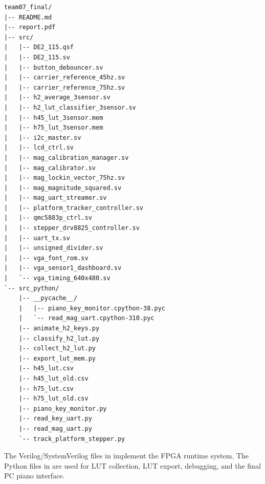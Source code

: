 \begin{lstlisting}
team07_final/
|-- README.md
|-- report.pdf
|-- src/
|   |-- DE2_115.qsf
|   |-- DE2_115.sv
|   |-- button_debouncer.sv
|   |-- carrier_reference_45hz.sv
|   |-- carrier_reference_75hz.sv
|   |-- h2_average_3sensor.sv
|   |-- h2_lut_classifier_3sensor.sv
|   |-- h45_lut_3sensor.mem
|   |-- h75_lut_3sensor.mem
|   |-- i2c_master.sv
|   |-- lcd_ctrl.sv
|   |-- mag_calibration_manager.sv
|   |-- mag_calibrator.sv
|   |-- mag_lockin_vector_75hz.sv
|   |-- mag_magnitude_squared.sv
|   |-- mag_uart_streamer.sv
|   |-- platform_tracker_controller.sv
|   |-- qmc5883p_ctrl.sv
|   |-- stepper_drv8825_controller.sv
|   |-- uart_tx.sv
|   |-- unsigned_divider.sv
|   |-- vga_font_rom.sv
|   |-- vga_sensor1_dashboard.sv
|   `-- vga_timing_640x480.sv
`-- src_python/
    |-- __pycache__/
    |   |-- piano_key_monitor.cpython-38.pyc
    |   `-- read_mag_uart.cpython-310.pyc
    |-- animate_h2_keys.py
    |-- classify_h2_lut.py
    |-- collect_h2_lut.py
    |-- export_lut_mem.py
    |-- h45_lut.csv
    |-- h45_lut_old.csv
    |-- h75_lut.csv
    |-- h75_lut_old.csv
    |-- piano_key_monitor.py
    |-- read_key_uart.py
    |-- read_mag_uart.py
    `-- track_platform_stepper.py
\end{lstlisting}

The Verilog/SystemVerilog files in  implement the FPGA runtime system. The Python files in  are used for LUT collection, LUT export, debugging, and the final PC piano interface.
